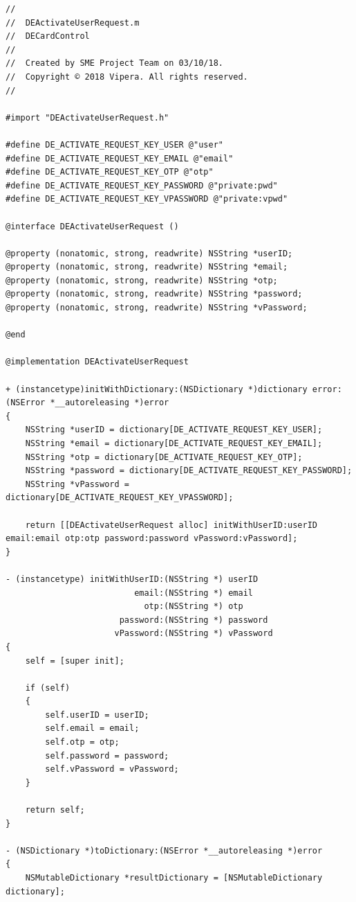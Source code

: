 \documentclass[a4paper, 12pt]{article}
\newenvironment{code}{\captionsetup{type=listing}}{}
\begin{document}
\begin{code}
\label{code:ios-serializer}
\begin{verbatim}
//
//  DEActivateUserRequest.m
//  DECardControl
//
//  Created by SME Project Team on 03/10/18.
//  Copyright © 2018 Vipera. All rights reserved.
//

#import "DEActivateUserRequest.h"

#define DE_ACTIVATE_REQUEST_KEY_USER @"user"
#define DE_ACTIVATE_REQUEST_KEY_EMAIL @"email"
#define DE_ACTIVATE_REQUEST_KEY_OTP @"otp"
#define DE_ACTIVATE_REQUEST_KEY_PASSWORD @"private:pwd"
#define DE_ACTIVATE_REQUEST_KEY_VPASSWORD @"private:vpwd"

@interface DEActivateUserRequest ()

@property (nonatomic, strong, readwrite) NSString *userID;
@property (nonatomic, strong, readwrite) NSString *email;
@property (nonatomic, strong, readwrite) NSString *otp;
@property (nonatomic, strong, readwrite) NSString *password;
@property (nonatomic, strong, readwrite) NSString *vPassword;

@end

@implementation DEActivateUserRequest

+ (instancetype)initWithDictionary:(NSDictionary *)dictionary error:(NSError *__autoreleasing *)error
{
    NSString *userID = dictionary[DE_ACTIVATE_REQUEST_KEY_USER];
    NSString *email = dictionary[DE_ACTIVATE_REQUEST_KEY_EMAIL];
    NSString *otp = dictionary[DE_ACTIVATE_REQUEST_KEY_OTP];
    NSString *password = dictionary[DE_ACTIVATE_REQUEST_KEY_PASSWORD];
    NSString *vPassword = dictionary[DE_ACTIVATE_REQUEST_KEY_VPASSWORD];

    return [[DEActivateUserRequest alloc] initWithUserID:userID email:email otp:otp password:password vPassword:vPassword];
}

- (instancetype) initWithUserID:(NSString *) userID
                          email:(NSString *) email
                            otp:(NSString *) otp
                       password:(NSString *) password
                      vPassword:(NSString *) vPassword
{
    self = [super init];

    if (self)
    {
        self.userID = userID;
        self.email = email;
        self.otp = otp;
        self.password = password;
        self.vPassword = vPassword;
    }

    return self;
}

- (NSDictionary *)toDictionary:(NSError *__autoreleasing *)error
{
    NSMutableDictionary *resultDictionary = [NSMutableDictionary dictionary];


\end{verbatim}
\end{code}
\end{document}
